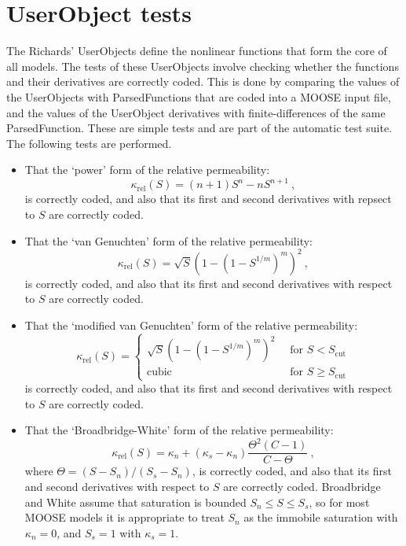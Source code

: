 \documentclass[]{scrreprt}
\begin{document}
\chapter{UserObject tests}
\label{uo}

The Richards' UserObjects define the nonlinear functions that form the
core of all models.  The tests of these UserObjects involve checking
whether the functions and their derivatives are correctly coded.  This
is done by comparing the values of the UserObjects with
ParsedFunctions that are coded into a MOOSE input file, and the values
of the UserObject derivatives with finite-differences of the same
ParsedFunction.  These are simple tests and are part of the automatic
test suite.  The following tests are performed.

\begin{itemize}

\item That the `power' form of the relative permeability:
\begin{equation}
\kappa_{\mathrm{rel}}(S) = (n+1)S^{n} - nS^{n+1} \ ,
\end{equation}
is correctly coded, and also that its first and second derivatives
with repsect to $S$ are correctly coded.

\item That the `van Genuchten' form of the relative permeability:
\begin{equation}
\kappa_{\mathrm{rel}}(S) = \sqrt{S}\left(1 - \left(1 -
S^{1/m}\right)^{m}\right)^{2} \ ,
\end{equation}
is correctly coded, and also that its first and second derivatives
with respect to $S$ are correctly coded.

\item That the `modified van Genuchten' form of the relative permeability:
\begin{equation}
\kappa_{\mathrm{rel}}(S) = \left\{
\begin{array}{ll}
\sqrt{S}\left(1 - \left(1 -
S^{1/m}\right)^{m}\right)^{2} \ & \mbox{ for } S<S_{\mathrm{cut}} \\
\mbox{cubic} \ & \mbox{ for } S \geq S_{\mathrm{cut}}
\end{array}
\right.
\end{equation}
is correctly coded, and also that its first and second derivatives
with respect to $S$ are correctly coded.

\item That the `Broadbridge-White' form of the relative permeability:
\begin{equation}
\kappa_{\mathrm{rel}}(S) = \kappa_{n} +
(\kappa_{s}-\kappa_{n})\frac{\Theta^{2}(C-1)}{C-\Theta} \ ,
\label{bw.krel}
\end{equation}
where $\Theta = (S-S_{n})/(S_{s}-S_{n})$, 
is correctly coded, and also that its first and second derivatives
with respect to $S$ are correctly coded.  Broadbridge and White assume
that saturation is bounded $S_{n}\leq S\leq S_{s}$, so for most MOOSE
models it is appropriate to treat $S_{n}$ as the immobile saturation
with $\kappa_{n}=0$, and $S_{s}=1$ with $\kappa_{s}=1$.


\end{itemize}
\end{document}
